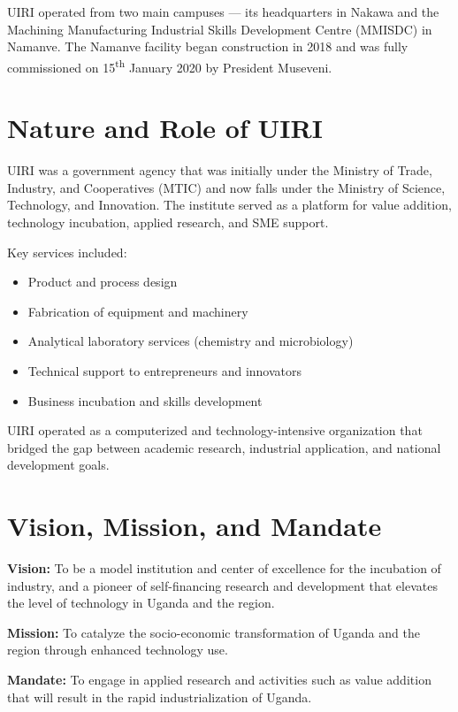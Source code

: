 \documentclass[12pt,a4paper]{report}
\begin{document}
\noindent UIRI operated from two main campuses — its headquarters in Nakawa and the Machining Manufacturing Industrial Skills Development Centre (MMISDC) in Namanve. The Namanve facility began construction in 2018 and was fully commissioned on 15\textsuperscript{th} January 2020 by President Museveni.

\section{Nature and Role of UIRI}
\noindent UIRI was a government agency that was initially under the Ministry of Trade, Industry, and Cooperatives (MTIC) and now falls under the Ministry of Science, Technology, and Innovation. The institute served as a platform for value addition, technology incubation, applied research, and SME support.

\noindent Key services included:
\begin{itemize}
    \item Product and process design
    \item Fabrication of equipment and machinery
    \item Analytical laboratory services (chemistry and microbiology)
    \item Technical support to entrepreneurs and innovators
    \item Business incubation and skills development
\end{itemize}

\noindent UIRI operated as a computerized and technology-intensive organization that bridged the gap between academic research, industrial application, and national development goals.

\section{Vision, Mission, and Mandate}
\noindent\textbf{Vision:} To be a model institution and center of excellence for the incubation of industry, and a pioneer of self-financing research and development that elevates the level of technology in Uganda and the region.

\noindent\textbf{Mission:} To catalyze the socio-economic transformation of Uganda and the region through enhanced technology use.

\noindent\textbf{Mandate:} To engage in applied research and activities such as value addition that will result in the rapid industrialization of Uganda.
\end{document}
